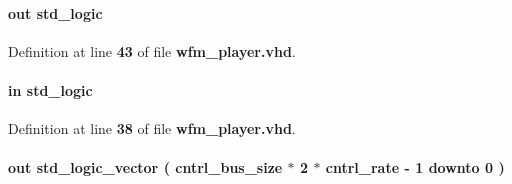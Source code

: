 \paragraph[{wcmd\+\_\+brst\+\_\+en}]{ {\bfseries \textcolor{keywordflow}{out}\textcolor{vhdlchar}{ }} {\bfseries \textcolor{comment}{std\+\_\+logic}\textcolor{vhdlchar}{ }} \hspace{0.3cm}{\ttfamily [Port]}}\label{classwfm__player_ab72031cd0cdd0c63ea34ae2f21d809da}


Definition at line {\bf 43} of file {\bf wfm\+\_\+player.\+vhd}.

\paragraph[{wcmd\+\_\+clk}]{ {\bfseries \textcolor{keywordflow}{in}\textcolor{vhdlchar}{ }} {\bfseries \textcolor{comment}{std\+\_\+logic}\textcolor{vhdlchar}{ }} \hspace{0.3cm}{\ttfamily [Port]}}\label{classwfm__player_a61d32071a7feae60ffaf6be32920acff}


Definition at line {\bf 38} of file {\bf wfm\+\_\+player.\+vhd}.

\paragraph[{wcmd\+\_\+data}]{ {\bfseries \textcolor{keywordflow}{out}\textcolor{vhdlchar}{ }} {\bfseries \textcolor{comment}{std\+\_\+logic\+\_\+vector}\textcolor{vhdlchar}{ }\textcolor{vhdlchar}{(}\textcolor{vhdlchar}{ }\textcolor{vhdlchar}{ }\textcolor{vhdlchar}{ }\textcolor{vhdlchar}{ }{\bfseries {\bf cntrl\+\_\+bus\+\_\+size}} \textcolor{vhdlchar}{$\ast$}\textcolor{vhdlchar}{ } \textcolor{vhdldigit}{2} \textcolor{vhdlchar}{$\ast$}\textcolor{vhdlchar}{ }\textcolor{vhdlchar}{ }\textcolor{vhdlchar}{ }{\bfseries {\bf cntrl\+\_\+rate}} \textcolor{vhdlchar}{-\/}\textcolor{vhdlchar}{ } \textcolor{vhdldigit}{1} \textcolor{vhdlchar}{ }\textcolor{keywordflow}{downto}\textcolor{vhdlchar}{ }\textcolor{vhdlchar}{ } \textcolor{vhdldigit}{0} \textcolor{vhdlchar}{ }\textcolor{vhdlchar}{)}\textcolor{vhdlchar}{ }} \hspace{0.3cm}{\ttfamily [Port]}}\label{classwfm__player_a13a1bd0a87bfbd9e1cde021cda42f048}


